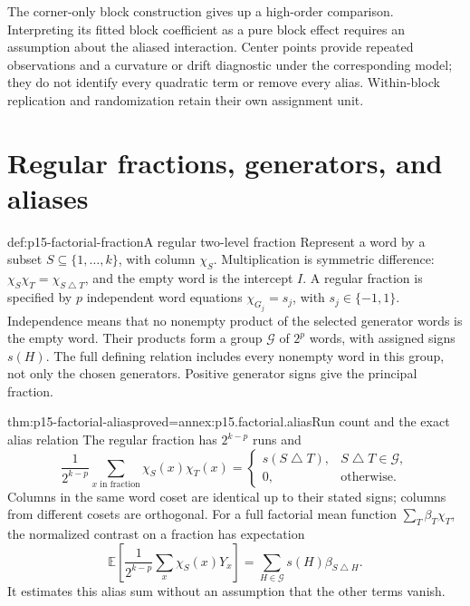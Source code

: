 The corner-only block construction gives up a high-order comparison.
Interpreting its fitted block coefficient as a pure block effect requires
an assumption about the aliased interaction. Center points provide repeated
observations and a curvature or drift diagnostic under the corresponding
model; they do not identify every quadratic term or remove every alias.
Within-block replication and randomization retain their own assignment unit.

\section{Regular fractions, generators, and aliases}
\label{sec:p15-factorial-fractions}

\begin{hbdefinition}{def:p15-factorial-fraction}{A regular two-level fraction}
Represent a word by a subset \(S\subseteq\{1,\ldots,k\}\), with
column \(\chi_S\). Multiplication is symmetric difference:
\(\chi_S\chi_T=\chi_{S\mathbin{\triangle}T}\), and the empty word
is the intercept \(I\). A regular fraction is specified by \(p\)
independent word equations
\(\chi_{G_j}=s_j\), with \(s_j\in\{-1,1\}\).
Independence means that no nonempty product of the selected generator words
is the empty word.
Their products form a group \(\mathcal G\) of \(2^p\) words, with
assigned signs \(s(H)\). The full defining relation includes every
nonempty word in this group, not only the chosen generators. Positive
generator signs give the principal fraction.
\end{hbdefinition}

\begin{hbtheorem}{thm:p15-factorial-alias}{proved=annex:p15.factorial.alias}{Run count and the exact alias relation}
The regular fraction has \(2^{k-p}\) runs and
\[
 \frac1{2^{k-p}}\sum_{x\text{ in fraction}}\chi_S(x)\chi_T(x)
 =\begin{cases}s(S\mathbin{\triangle}T),&S\mathbin{\triangle}T\in\mathcal G,\\
 0,&\text{otherwise}.
 \end{cases}
\]
Columns in the same word coset are identical up to their stated signs;
columns from different cosets are orthogonal. For a full factorial mean
function \(\sum_T\beta_T\chi_T\), the normalized contrast on a fraction
has expectation
\[
 \mathbb E\!\left[\frac1{2^{k-p}}\sum_x\chi_S(x)Y_x\right]
   =\sum_{H\in\mathcal G}s(H)\beta_{S\mathbin{\triangle}H}.
\]
It estimates this alias sum without an assumption that the other terms vanish.
\end{hbtheorem}

